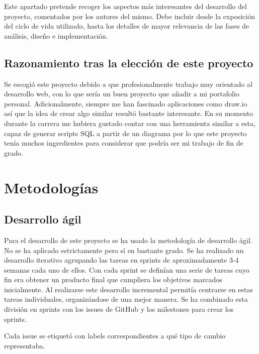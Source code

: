 
Este apartado pretende recoger los aspectos más interesantes del desarrollo del proyecto, comentados por los autores del mismo. Debe incluir desde la exposición del ciclo de vida utilizado, hasta los detalles de mayor relevancia de las fases de análisis, diseño e implementación.

\subsection{Razonamiento tras la elección de este proyecto}
Se escogió este proyecto debido a que profesionalmente trabajo muy orientado al desarrollo web, con lo que sería un buen proyecto que añadir a mi portafolio personal. Adicionalmente, siempre me han fascinado aplicaciones como draw.io así que la idea de crear algo similar resultó bastante interesante.
En su momento durante la carrera me hubiera gustado contar con una herramienta similar a esta, capaz de generar scripts SQL a partir de un diagrama por lo que este proyecto tenía muchos ingredientes para considerar que podría ser mi trabajo de fin de grado.

\section{Metodologías}
\subsection{Desarrollo ágil}
Para el desarrollo de este proyecto se ha usado la metodología de desarrollo ágil. No se ha aplicado estrictamente pero sí en bastante grado. Se ha realizado un desarrollo iterativo agrupando las tareas en sprints de aproximadamente 3-4 semanas cada uno de ellos.
Con cada sprint se definían una serie de tareas cuyo fin era obtener un producto final que cumpliera los objetivos marcados inicialmente. Al realizarse este desarrollo incremental permitía centrarse en estas tareas individuales, organizándose de una mejor manera.
Se ha combinado esta división en sprints con los issues de GitHub y los milestones para crear los sprints.


Cada issue se etiquetó con labels correspondientes a qué tipo de cambio representaba.


